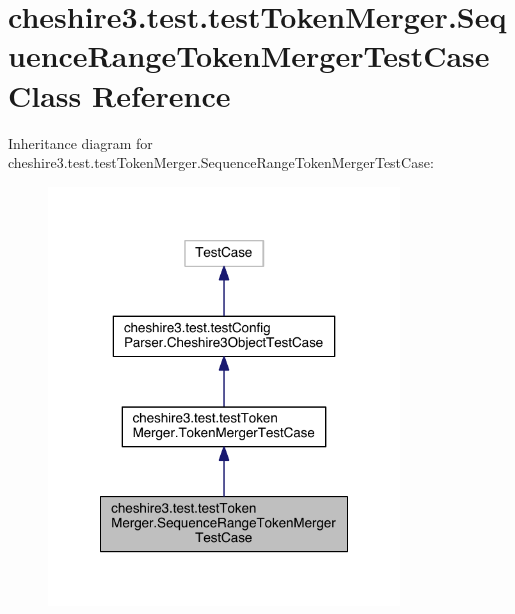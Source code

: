 \hypertarget{classcheshire3_1_1test_1_1test_token_merger_1_1_sequence_range_token_merger_test_case}{\section{cheshire3.\-test.\-test\-Token\-Merger.\-Sequence\-Range\-Token\-Merger\-Test\-Case Class Reference}
\label{classcheshire3_1_1test_1_1test_token_merger_1_1_sequence_range_token_merger_test_case}
}


Inheritance diagram for cheshire3.\-test.\-test\-Token\-Merger.\-Sequence\-Range\-Token\-Merger\-Test\-Case\-:
\nopagebreak
\begin{figure}[H]
\begin{center}
\leavevmode
\includegraphics[width=264pt]{classcheshire3_1_1test_1_1test_token_merger_1_1_sequence_range_token_merger_test_case__inherit__graph}
\end{center}
\end{figure}


